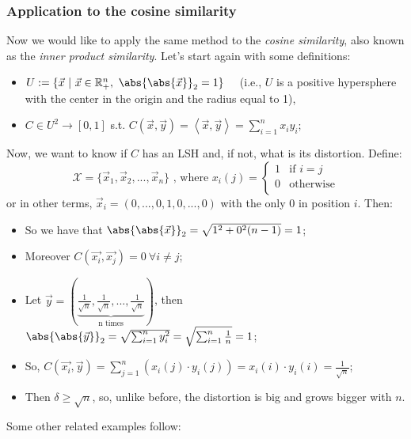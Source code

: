 \subsubsection{Application to the cosine similarity}

Now we would like to apply the same method to the \emph{cosine similarity}, also known as the \emph{inner product similarity}.  Let's start again with some definitions:

\begin{itemize}
    \item $U := \{ \vec{x} \ | \ \vec{x} \in \mathbb{R}_+^n, \ \abs{\abs{\vec{x}}}_2=1 \}$ \ \
    (i.e., $U$ is a positive hypersphere with the center in the origin and the radius equal to 1),
    \item $C \in U^2 \to [0,1]$ s.t. $C(\vec{x}, \vec{y}) = \left\langle \vec{x}, \vec{y} \right\rangle = \sum_{i=1}^n x_iy_i$;
\end{itemize}

Now, we want to know if $C$ has an LSH and, if not, what is its distortion. Define:
\[
    \mathcal{X}=\{ \vec{x}_1, \vec{x}_2, ..., \vec{x}_n \} \text{ , where } x_i(j)=\begin{cases}
        1 & \text{if } i = j \\
        0 & \text{otherwise} \\
    \end{cases} 
\]
or in other terms, $\vec{x}_i=(0,...,0,1,0,...,0)$ with the only 0 in position $i$. Then:

\begin{itemize}
    \item So we have that $\abs{\abs{\vec{x}}}_2=\sqrt{1^2+0^2(n-1)}=1$;
    \item Moreover $C(\vec{x_i}, \vec{x_j})=0 \ \forall i\neq j$;
    \item Let $\vec{y}=\left( \underbrace{\frac{1}{\sqrt{n}}, \frac{1}{\sqrt{n}}, ..., \frac{1}{\sqrt{n}}}_\text{n times} \right)$, then $\abs{\abs{\vec{y}}}_2 = \sqrt{\sum_{i=1}^n y_i^2} = \sqrt{\sum_{i=1}^n \frac{1}{n}}=1$;
    \item So, $C(\vec{x_i}, \vec{y})= \sum_{j=1}^n \left( x_i(j) \cdot y_i(j) \right) = x_i(i) \cdot y_i(i) = \frac{1}{\sqrt{n}}$;
    \item Then $\delta \geq \sqrt{n}$, so, unlike before, the distortion is big and grows bigger with $n$.
\end{itemize}

Some other related examples follow:

